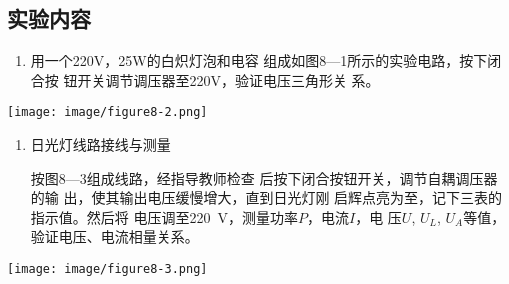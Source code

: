\documentclass[UTF8]{article}
\begin{document}
        \subsection{实验内容}
            \begin{adjustwidth}{0em}{0em}
                \begin{minipage}[H]{0.45\textwidth}
                    \begin{enumerate}[label=\textbf{\arabic*}.]
                        \item 用一个220\si{\volt}，25\si{\watt}的白炽灯泡和电容
                        组成如图8—1所示的实验电路，按下闭合按
                        钮开关调节调压器至220\si{\volt}，验证电压三角形关
                        系。 
                    \end{enumerate}
                \end{minipage}
                \begin{minipage}[H]{0.45\textwidth}
                    \centering
                    \texttt{[image: image/figure8-2.png]}
                \end{minipage}
            \end{adjustwidth}
            \begin{adjustwidth}{0em}{0em}
                \begin{minipage}[H]{0.45\textwidth}
                    \begin{enumerate}[label=\textbf{\arabic*}., start=2]    
                        \item 日光灯线路接线与测量
                        \par
                        按图8—3组成线路，经指导教师检查
                        后按下闭合按钮开关，调节自耦调压器的输
                        出，使其输出电压缓慢增大，直到日光灯刚
                        启辉点亮为至，记下三表的指示值。然后将
                        电压调至\SI{220}{\volt}，测量功率$P$，电流$I$，电
                        压$U$, $U_L$, $U_A$等值，验证电压、电流相量关系。
                    \end{enumerate}
                \end{minipage}
                \begin{minipage}[H]{0.45\textwidth}
                    \centering
                    \texttt{[image: image/figure8-3.png]}
                \end{minipage}
            \end{adjustwidth}
\end{document}
